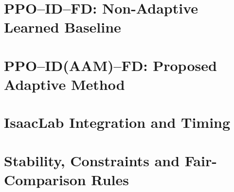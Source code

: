 \section{PPO--ID--FD: Non-Adaptive Learned Baseline}
\label{sec:ctrl:ppo-idfd}

\section{PPO--ID(AAM)--FD: Proposed Adaptive Method}
\label{sec:ctrl:ppo-idaamfd}

\section{IsaacLab Integration and Timing}
\label{sec:ctrl:integration}

\section{Stability, Constraints and Fair-Comparison Rules}
\label{sec:ctrl:constraints}
